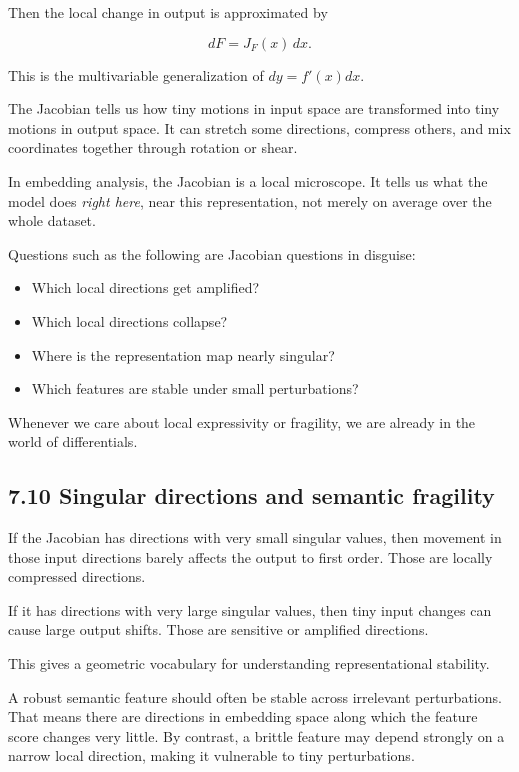 Then the local change in output is approximated by

\[
dF = J_F(x)\,dx.
\]

This is the multivariable generalization of \(dy=f'(x)dx\).

The Jacobian tells us how tiny motions in input space are transformed
into tiny motions in output space. It can stretch some directions,
compress others, and mix coordinates together through rotation or shear.

In embedding analysis, the Jacobian is a local microscope. It tells us
what the model does \emph{right here}, near this representation, not
merely on average over the whole dataset.

Questions such as the following are Jacobian questions in disguise:

\begin{itemize}
\tightlist
\item
  Which local directions get amplified?
\item
  Which local directions collapse?
\item
  Where is the representation map nearly singular?
\item
  Which features are stable under small perturbations?
\end{itemize}

Whenever we care about local expressivity or fragility, we are already
in the world of differentials.

\hypertarget{singular-directions-and-semantic-fragility}{%
\subsection{7.10 Singular directions and semantic
fragility}\label{singular-directions-and-semantic-fragility}}

If the Jacobian has directions with very small singular values, then
movement in those input directions barely affects the output to first
order. Those are locally compressed directions.

If it has directions with very large singular values, then tiny input
changes can cause large output shifts. Those are sensitive or amplified
directions.

This gives a geometric vocabulary for understanding representational
stability.

A robust semantic feature should often be stable across irrelevant
perturbations. That means there are directions in embedding space along
which the feature score changes very little. By contrast, a brittle
feature may depend strongly on a narrow local direction, making it
vulnerable to tiny perturbations.

